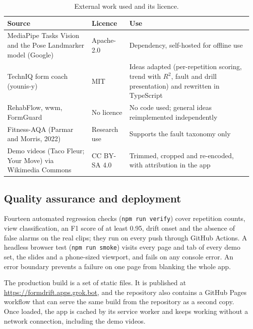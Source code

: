 \documentclass[12pt]{article}
\begin{document}
\begin{table}[!htbp]
\centering
\caption{External work used and its licence.}
\small
\begin{tabularx}{\textwidth}{>{\raggedright\arraybackslash}p{4.6cm} >{\raggedright\arraybackslash}p{2.6cm} L}
\toprule
\textbf{Source} & \textbf{Licence} & \textbf{Use} \\
\midrule
MediaPipe Tasks Vision and the Pose Landmarker model (Google) & Apache-2.0 & Dependency, self-hosted for offline use \\
TechnIQ form coach (younis-y) & MIT & Ideas adapted (per-repetition scoring, trend with $R^2$, fault and drill presentation) and rewritten in TypeScript \\
RehabFlow, wwm, FormGuard & No licence & No code used; general ideas reimplemented independently \\
Fitness-AQA (Parmar and Morris, 2022) & Research use & Supports the fault taxonomy only \\
Demo videos (Taco Fleur; Your Move) via Wikimedia Commons & CC BY-SA 4.0 & Trimmed, cropped and re-encoded, with attribution in the app \\
\bottomrule
\end{tabularx}
\end{table}

\subsection{Quality assurance and deployment}

Fourteen automated regression checks (\texttt{npm run verify}) cover repetition counts, view classification, an F1 score of at least 0.95, drift onset and the absence of false alarms on the real clips; they run on every push through GitHub Actions. A headless browser test (\texttt{npm run smoke}) visits every page and tab of every demo set, the slides and a phone-sized viewport, and fails on any console error. An error boundary prevents a failure on one page from blanking the whole app.

The production build is a set of static files. It is published at \url{https://formdrift.apps.grok.bot}, and the repository also contains a GitHub Pages workflow that can serve the same build from the repository as a second copy. Once loaded, the app is cached by its service worker and keeps working without a network connection, including the demo videos.


\end{document}
